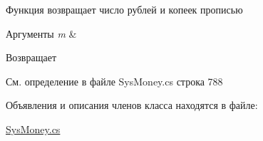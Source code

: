 Функция возвращает число рублей и копеек прописью 


\begin{DoxyParams}{Аргументы}
{\em m} & \\
\hline
\end{DoxyParams}
\begin{DoxyReturn}{Возвращает}

\end{DoxyReturn}


См. определение в файле Sys\+Money.\+cs строка 788



Объявления и описания членов класса находятся в файле\+:\begin{DoxyCompactItemize}
\item 
\mbox{\hyperlink{_sys_money_8cs}{Sys\+Money.\+cs}}\end{DoxyCompactItemize}
